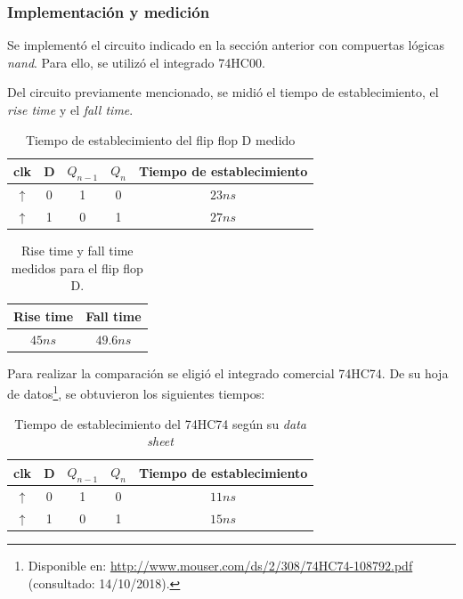 \documentclass[../../e3_tp2_main.tex]{subfiles}
\begin{document}
\subsubsection{Implementación y medici\'on}
Se implementó el circuito indicado en la sección anterior con compuertas lógicas \textit{nand}. Para ello, se utilizó el integrado 74HC00.\par

Del circuito previamente mencionado, se midió el tiempo de establecimiento, el \textit{rise time} y el \textit{fall time}. 

\begin{table}[H]
\begin{center}
\begin{tabular}{|c|c|c|c|c|}
\hline
clk& D & $Q_{n-1}$ & $Q_n$ &Tiempo de establecimiento\\
\hline \hline
$\uparrow$ &0& 1&0&$23 n s$  \\ \hline
$\uparrow$ &1&0&1&$27 n s$  \\ \hline
\end{tabular}
\caption{Tiempo de establecimiento del flip flop D medido} 
\end{center}
\end{table}

\begin{table}[H]
\begin{center}
\begin{tabular}{|c|c|}
\hline
Rise time& Fall time \\
\hline \hline
$45 n s$  & $49.6 n s$ \\ \hline
\end{tabular}
\caption{Rise time y fall time medidos para el flip flop D.} 
\end{center}
\end{table}

Para realizar la comparación se eligió el integrado comercial 74HC74. De su hoja de datos\footnote{Disponible en: \url{http://www.mouser.com/ds/2/308/74HC74-108792.pdf} (consultado: 14/10/2018).}, se obtuvieron los siguientes tiempos:

\begin{table}[H]
\begin{center}
\begin{tabular}{|c|c|c|c|c|}
\hline
clk& D & $Q_{n-1}$ & $Q_n$ &Tiempo de establecimiento\\
\hline \hline
$\uparrow$ &0& 1&0&$11 n s$  \\ \hline
$\uparrow$ &1&0&1&$15 n s$  \\ \hline
\end{tabular}
\caption{Tiempo de establecimiento del 74HC74 seg\'un su \textit{data sheet}} 
\end{center}
\end{table}
\end{document}
